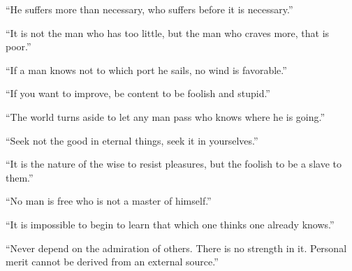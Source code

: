 “He suffers more than necessary, who suffers before it is necessary.”

“It is not the man who has too little, but the man who craves more, that is poor.”

“If a man knows not to which port he sails, no wind is favorable.”

“If you want to improve, be content to be foolish and stupid.”

“The world turns aside to let any man pass who knows where he is going.”

“Seek not the good in eternal things, seek it in yourselves.”

“It is the nature of the wise to resist pleasures, but the foolish to be a slave to them.”

“No man is free who is not a master of himself.”

“It is impossible to begin to learn that which one thinks one already knows.”

“Never depend on the admiration of others. There is no strength in it. Personal merit cannot be derived from an external source.”
